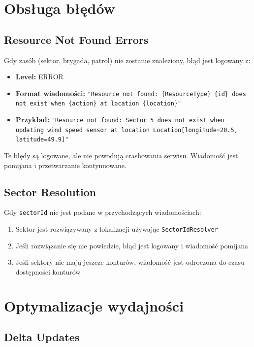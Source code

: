 \section{Obsługa błędów}

\subsection{Resource Not Found Errors}

Gdy zasób (sektor, brygada, patrol) nie zostanie znaleziony, błąd jest logowany z:
\begin{itemize}
    \item \textbf{Level:} ERROR
    \item \textbf{Format wiadomości:} \texttt{"Resource not found: \{ResourceType\} \{id\} does not exist when \{action\} at location \{location\}"}
    \item \textbf{Przykład:} \texttt{"Resource not found: Sector 5 does not exist when updating wind speed sensor at location Location[longitude=20.5, latitude=49.9]"}
\end{itemize}

Te błędy są logowane, ale nie powodują crashowania serwisu. Wiadomość jest pomijana i przetwarzanie kontynuowane.

\subsection{Sector Resolution}

Gdy \texttt{sectorId} nie jest podane w przychodzących wiadomościach:
\begin{enumerate}
    \item Sektor jest rozwiązywany z lokalizacji używając \texttt{SectorIdResolver}
    \item Jeśli rozwiązanie się nie powiedzie, błąd jest logowany i wiadomość pomijana
    \item Jeśli sektory nie mają jeszcze konturów, wiadomość jest odroczona do czasu dostępności konturów
\end{enumerate}

\section{Optymalizacje wydajności}

\subsection{Delta Updates}

